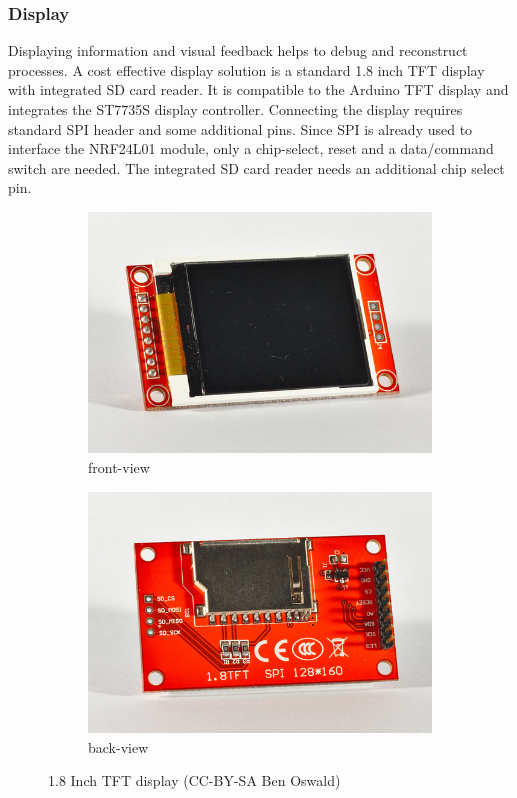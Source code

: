 \documentclass[11pt,a4paper]{article}
\begin{document}
\subsubsection{Display}
Displaying information and visual feedback helps to debug and reconstruct processes. A cost effective display solution is a standard 1.8 inch TFT display with integrated SD card reader. It is compatible to the Arduino TFT display and integrates the ST7735S display controller. Connecting the display requires standard SPI header and some additional pins. Since SPI is already used to interface the NRF24L01 module, only a chip-select, reset and a data/command switch are needed. The integrated SD card reader needs an additional chip select pin.

\begin{figure}[h!]
  \centering
  \begin{subfigure}{0.48\textwidth}
  \centering
  \includegraphics[width=0.9\linewidth]{images/30_tftfront.jpg}
  \caption{front-view}
  \end{subfigure}
  \begin{subfigure}{0.48\textwidth}
  \centering
  \includegraphics[width=0.9\linewidth]{images/30_tftback.jpg}
  \caption{back-view}
  \end{subfigure}
  \caption{1.8 Inch TFT display (CC-BY-SA Ben Oswald)}
\end{figure}
\end{document}
